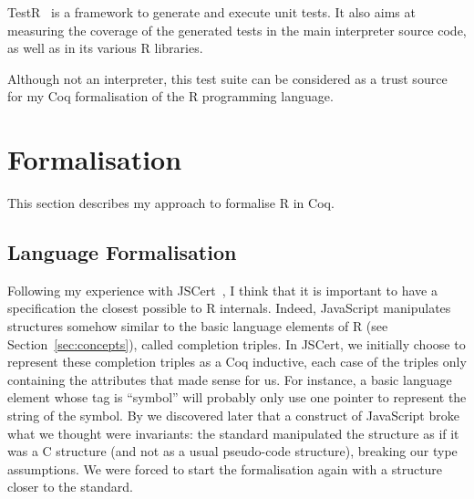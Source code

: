 \documentclass{article}
\newcommand\Coq{Coq}
\newcommand\R{R}
\newcommand\Cn{C}
\begin{document}
TestR~\parencite{maj2013testr, 2014testr} is a framework to generate and execute unit tests.
It also aims at measuring the coverage of the generated tests
in the main interpreter source code,
as well as in its various \R{} libraries.

Although not an interpreter,
this test suite can be considered as a trust source
for my \Coq{} formalisation of the \R{} programming language.


\section{Formalisation}
\label{sec:formalisation}

This section describes my approach to formalise \R{} in \Coq{}.

\subsection{Language Formalisation}
\label{sec:language:formalisation}

Following my experience with JSCert~\parencite{bodin2014trusted},
I think that it is important to have a specification
the closest possible to \R{} internals.
Indeed, JavaScript manipulates structures somehow similar
to the basic language elements of \R{} (see Section~\ref{sec:concepts}),
called completion triples.
In JSCert, we initially choose to represent these completion triples
as a \Coq{} inductive,
each case of the triples only containing the attributes that made sense for us.
For instance, a basic language element whose tag is “symbol”
will probably only use one pointer to represent the string of the symbol.
By we discovered later that a construct of JavaScript %
broke what we thought were invariants:
the standard manipulated the structure as if it was a \Cn{} structure
(and not as a usual pseudo-code structure),
breaking our type assumptions.
We were forced to start the formalisation again with a structure
closer to the standard.
\end{document}
